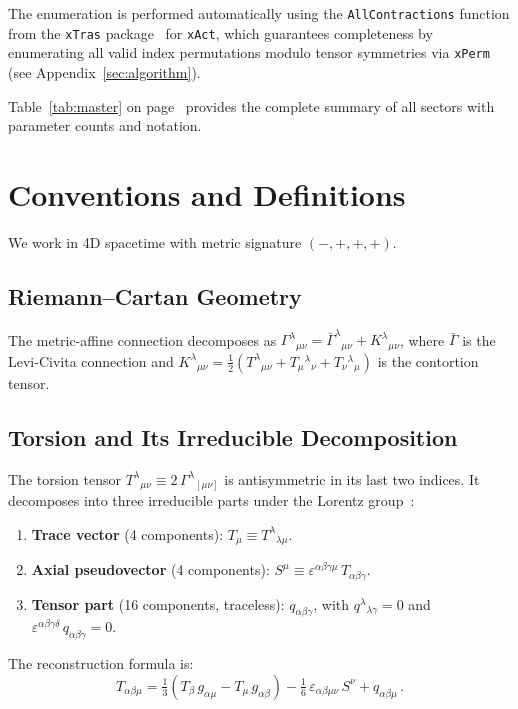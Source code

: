 \documentclass[12pt,a4paper]{article}
\newcommand{\eps}{\varepsilon}       %
\begin{document}
The enumeration is performed automatically using the
\texttt{AllContractions} function from the \texttt{xTras}
package~\cite{xTras} for \texttt{xAct}, which guarantees
completeness by enumerating all valid index permutations modulo
tensor symmetries via \texttt{xPerm} (see Appendix~\ref{sec:algorithm}).

Table~\ref{tab:master} on page~\pageref{tab:master} provides the
complete summary of all sectors with parameter counts and notation.


\section{Conventions and Definitions}
\label{sec:conventions}

We work in 4D spacetime with metric signature $(-,+,+,+)$.

\subsection{Riemann--Cartan Geometry}

The metric-affine connection decomposes as
$\Gamma^\lambda{}_{\mu\nu} = \bar{\Gamma}^\lambda{}_{\mu\nu}
+ K^\lambda{}_{\mu\nu}$, where $\bar{\Gamma}$ is the Levi-Civita
connection and $K^\lambda{}_{\mu\nu}
= \tfrac{1}{2}(T^\lambda{}_{\mu\nu} + T_\mu{}^\lambda{}_\nu
+ T_\nu{}^\lambda{}_\mu)$ is the contortion tensor.

\subsection{Torsion and Its Irreducible Decomposition}

The torsion tensor $T^\lambda{}_{\mu\nu}
\equiv 2\,\Gamma^\lambda{}_{[\mu\nu]}$ is antisymmetric in its
last two indices. It decomposes into three irreducible parts
under the Lorentz group~\cite{Shapiro:2001rz}:
\begin{enumerate}[label=(\roman*)]
  \item \textbf{Trace vector} (4 components):
    $T_\mu \equiv T^\lambda{}_{\lambda\mu}$.
  \item \textbf{Axial pseudovector} (4 components):
    $S^\mu \equiv \eps^{\alpha\beta\gamma\mu}\, T_{\alpha\beta\gamma}$.
  \item \textbf{Tensor part} (16 components, traceless):
    $q_{\alpha\beta\gamma}$, with
    $q^\lambda{}_{\lambda\gamma} = 0$ and
    $\eps^{\alpha\beta\gamma\delta}\, q_{\alpha\beta\gamma} = 0$.
\end{enumerate}
The reconstruction formula is:
\begin{equation}
  T_{\alpha\beta\mu}
  = \tfrac{1}{3}(T_\beta\, g_{\alpha\mu} - T_\mu\, g_{\alpha\beta})
  - \tfrac{1}{6}\,\eps_{\alpha\beta\mu\nu}\, S^\nu
  + q_{\alpha\beta\mu}\,.
  \label{eq:torsion_reconstruct}
\end{equation}
\end{document}
